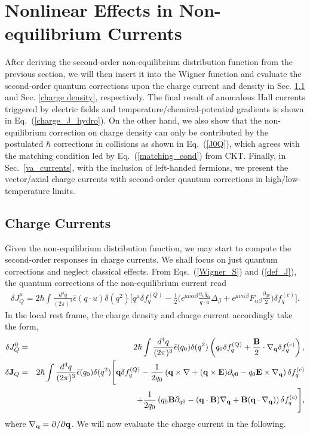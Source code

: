 \documentclass[aps,prd,showkeys,preprint,amsmath,amssymb,nofootinbib]{revtex4-1}
\begin{document}
\section{ Nonlinear Effects in Non-equilibrium Currents}\label{Nonlinear_Effects}
After deriving the second-order non-equilibrium distribution function from the previous section, we will then insert it into the Wigner function and evaluate the second-order quantum corrections upon the charge current and density in Sec. \ref{charge} and Sec. \ref{charge density}, respectively. The final result of anomalous Hall currents triggered by electric fields and temperature/chemical-potential gradients is shown in Eq.~(\ref{charge_J_hydro}). On the other hand, we also show that the non-equilibrium correction on charge density can only be contributed by the postulated $\hbar$ corrections in collisions as shown in Eq.~(\ref{J0Q}), which agrees with the matching condition led by Eq.~(\ref{matching_cond}) from CKT. Finally, in Sec.~\ref{va_currents}, with the inclusion of left-handed fermions, we present the vector/axial charge currents with second-order quantum corrections in high/low-temperature limits.
\subsection{Charge Currents} \label{charge}
Given the non-equilibrium distribution function, we may start to compute the second-order responses in charge currents. We shall focus on just quantum corrections and neglect classical effects. From Eqs.~(\ref{Wigner_S}) and (\ref{def_J}), the quantum corrections of the non-equilibrium current read 
\begin{eqnarray}
\delta J_Q^{\mu}=2\hbar\int\frac{d^4q}{(2\pi)^3}\bar{\epsilon}(q\cdot u)\delta(q^2)\Bigg[ q^{\mu}\delta f^{(Q)}_q
-\frac{1}{2}\Bigg(\epsilon^{\mu\nu\alpha\beta}\frac{u_{\nu}q_{\alpha}}{q\cdot u}\Delta_{\beta}
+\epsilon^{\mu\nu\alpha\beta}F_{\alpha\beta}\frac{\partial_{q\nu}}{2}\Bigg)
\delta f^{(c)}_q
\Bigg].
\end{eqnarray}
In the local rest frame, the charge density and charge current accordingly take the form,
\begin{eqnarray}\nonumber\label{delJQl}
\delta J_Q^{0}&=&2\hbar\int\frac{d^4q}{(2\pi)^3}\bar{\epsilon}(q_0)\delta(q^2)\left(q_0\delta f^{(Q)}_q+\frac{\bf B}{2}\cdot\nabla_{\bf q}\delta f^{(c)}_q\right),
\\\nonumber
\delta {\bf J}_Q&=&2\hbar\int\frac{d^4q}{(2\pi)^3}\bar{\epsilon}(q_0)\delta(q^2)\Bigg[{\bf q}\delta f^{(Q)}_q
-\frac{1}{2q_0}\left({\bf q}\times\nabla+({\bf q\times E})\partial_{q0}-q_0{\bf E}\times\nabla_{\bf q}\right)\delta f^{(c)}_q
\\
&&+\frac{1}{2q_0}\left(q_0{\bf B}\partial_{q0}
-({\bf q\cdot B})\nabla_{\bf q}+{\bf B}({\bf q}\cdot\nabla_{\bf q})
\right)
\delta f^{(c)}_q
\Bigg],
\end{eqnarray} 
where $\nabla_{\bf q}=\partial/\partial {\bf q}$. We will now evaluate the charge current in the following. 
\end{document}
